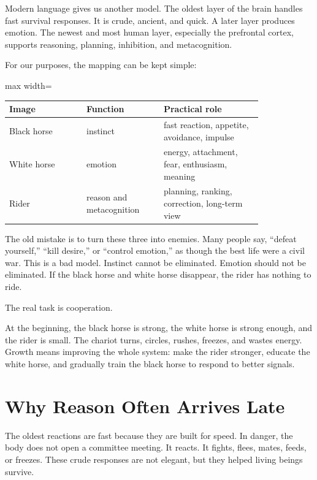 Modern language gives us another model. The oldest layer of the brain handles fast survival responses. It is crude, ancient, and quick. A later layer produces emotion. The newest and most human layer, especially the prefrontal cortex, supports reasoning, planning, inhibition, and metacognition.

For our purposes, the mapping can be kept simple:

\begin{center}
\begin{adjustbox}{max width=\linewidth}
\begin{tabular}{p{0.25\linewidth}p{0.25\linewidth}p{0.32\linewidth}}
\hline
Image & Function & Practical role \\
\hline
Black horse & instinct & fast reaction, appetite, avoidance, impulse \\
White horse & emotion & energy, attachment, fear, enthusiasm, meaning \\
Rider & reason and metacognition & planning, ranking, correction, long-term view \\
\hline
\end{tabular}
\end{adjustbox}
\end{center}

The old mistake is to turn these three into enemies. Many people say, ``defeat yourself,'' ``kill desire,'' or ``control emotion,'' as though the best life were a civil war. This is a bad model. Instinct cannot be eliminated. Emotion should not be eliminated. If the black horse and white horse disappear, the rider has nothing to ride.

The real task is cooperation.

At the beginning, the black horse is strong, the white horse is strong enough, and the rider is small. The chariot turns, circles, rushes, freezes, and wastes energy. Growth means improving the whole system: make the rider stronger, educate the white horse, and gradually train the black horse to respond to better signals.

\section*{Why Reason Often Arrives Late}

The oldest reactions are fast because they are built for speed. In danger, the body does not open a committee meeting. It reacts. It fights, flees, mates, feeds, or freezes. These crude responses are not elegant, but they helped living beings survive.

